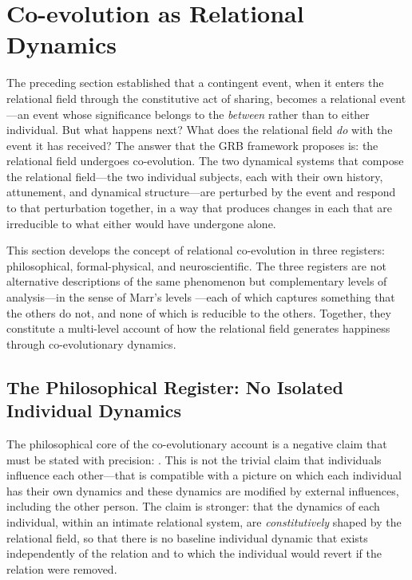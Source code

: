 \section{Co-evolution as Relational Dynamics}
\label{p14:sec:coevolution}

\noindent
The preceding section established that a contingent event, when it enters the relational field through the constitutive act of sharing, becomes a relational event---an event whose significance belongs to the \emph{between} rather than to either individual. But what happens next? What does the relational field \emph{do} with the event it has received? The answer that the GRB framework proposes is: the relational field undergoes co-evolution. The two dynamical systems that compose the relational field---the two individual subjects, each with their own history, attunement, and dynamical structure---are perturbed by the event and respond to that perturbation together, in a way that produces changes in each that are irreducible to what either would have undergone alone.

This section develops the concept of relational co-evolution in three registers: philosophical, formal-physical, and neuroscientific. The three registers are not alternative descriptions of the same phenomenon but complementary levels of analysis---in the sense of Marr's levels \parencite{marr1982}---each of which captures something that the others do not, and none of which is reducible to the others. Together, they constitute a multi-level account of how the relational field generates happiness through co-evolutionary dynamics.

\subsection{The Philosophical Register: No Isolated Individual Dynamics}
\label{p14:subsec:philocoevo}

\noindent
The philosophical core of the co-evolutionary account is a negative claim that must be stated with precision: . This is not the trivial claim that individuals influence each other---that is compatible with a picture on which each individual has their own dynamics and these dynamics are modified by external influences, including the other person. The claim is stronger: that the dynamics of each individual, within an intimate relational system, are \emph{constitutively} shaped by the relational field, so that there is no baseline individual dynamic that exists independently of the relation and to which the individual would revert if the relation were removed.

